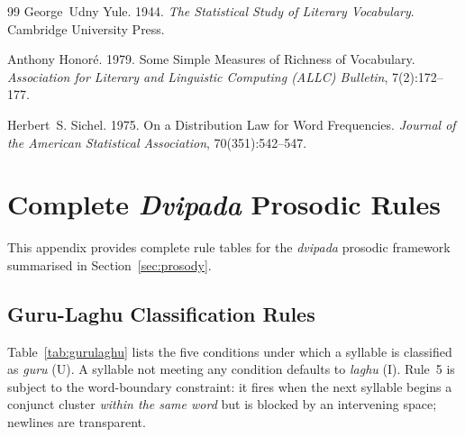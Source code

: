 \documentclass[11pt]{article}
\begin{document}
\begin{thebibliography}{99}
George~Udny Yule. 1944.
\newblock \textit{The Statistical Study of Literary Vocabulary}.
\newblock Cambridge University Press.

Anthony Honor{\'e}. 1979.
\newblock Some Simple Measures of Richness of Vocabulary.
\newblock \textit{Association for Literary and Linguistic Computing (ALLC) Bulletin}, 7(2):172--177.

Herbert~S. Sichel. 1975.
\newblock On a Distribution Law for Word Frequencies.
\newblock \textit{Journal of the American Statistical Association}, 70(351):542--547.

\end{thebibliography}

\appendix

\section{Complete \textit{Dvipada} Prosodic Rules}
\label{app:rules}

This appendix provides complete rule tables for the \textit{dvipada} prosodic
framework summarised in Section~\ref{sec:prosody}.

\subsection{Guru-Laghu Classification Rules}
\label{app:gurulaghu}

Table~\ref{tab:gurulaghu} lists the five conditions under which a syllable is
classified as \textit{guru} (U). A syllable not meeting any condition defaults
to \textit{laghu} (I). Rule~5 is subject to the word-boundary constraint:
it fires when the next syllable begins a conjunct cluster \emph{within the
same word} but is blocked by an intervening space; newlines are transparent.
\end{document}
